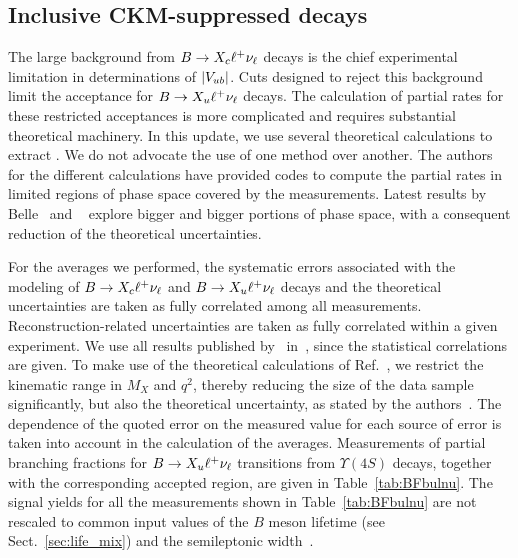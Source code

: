 \subsection{Inclusive CKM-suppressed decays}
\label{slbdecays_b2uincl}
The large background from $B\to X_c\ell^+\nu_\ell$ decays is the chief
experimental limitation in determinations of $|V_{ub}|$.  Cuts designed to
reject this background limit the acceptance for $B\to X_u\ell^+\nu_\ell$
decays. The calculation of partial rates for these restricted
acceptances is more complicated and requires substantial theoretical machinery.
In this update, we use several theoretical calculations
to extract \vub. We do not advocate the use of one method over another.
The authors for the different calculations have provided 
codes to compute the partial rates in limited regions of phase space covered by the measurements. 
Latest results by Belle~\cite{ref:belle-multivariate} and \babar~\cite{ref:babar-finalupdate} 
explore bigger and bigger portions of phase space, with a consequent reduction of the theoretical 
uncertainties. 

For the averages we performed, the systematic errors associated with the
modeling of $B\to X_c\ell^+\nu_\ell$ and $B\to X_u\ell^+\nu_\ell$ decays and the theoretical
uncertainties are taken as fully correlated among all measurements.
Reconstruction-related uncertainties are taken as fully correlated within a given experiment.
We use all results published by \babar\ in~\cite{ref:babar-finalupdate}, since the 
statistical correlations are given. 
To make use of the theoretical calculations of Ref.~\cite{ref:BLL}, we restrict the
kinematic range in $M_X$ and $q^2$, thereby reducing the size of the data
sample significantly, but also the theoretical uncertainty, as stated by the
authors~\cite{ref:BLL}.
The dependence of the quoted error on the measured value for each source of error
is taken into account in the calculation of the averages.
Measurements of partial branching fractions for $B\to X_u\ell^+\nu_\ell$
transitions from $\Upsilon(4S)$ decays, together with the corresponding accepted region, 
are given in Table~\ref{tab:BFbulnu}.  
The signal yields for all the measurements shown in Table~\ref{tab:BFbulnu}
are not rescaled to common input values of the $B$ meson lifetime (see Sect.~\ref{sec:life_mix})
and the semileptonic width~\cite{PDG_2008}.

